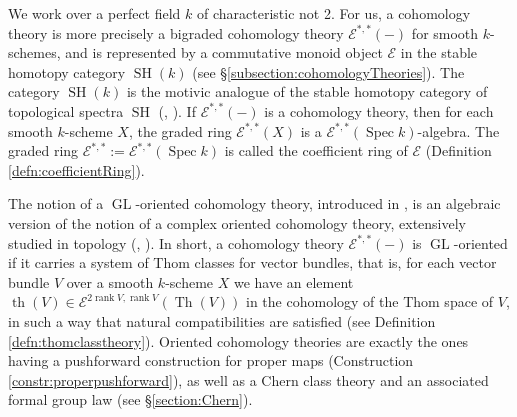 \documentclass[10pt]{amsart}
\theoremstyle{definition}
\theoremstyle{plain}
\numberwithin{equation}{section}
\newcommand{\0}{\emptyset}
\newcommand{\sE}{{\mathcal E}}
\newcommand{\GL}{{\operatorname{GL}}}
\newcommand{\Spec}{{\operatorname{Spec}}}
\newcommand{\SH}{{\operatorname{SH}}}
\newcommand{\Th}{{\operatorname{Th}}}
\renewcommand{\th}{{\operatorname{th}}}
\newcommand{\rnk}{{\operatorname{rank}}}
\begin{document}
We work over a perfect field $k$ of characteristic not 2. For us, a cohomology theory is more precisely a bigraded cohomology theory $\sE^{*,*}(-)$ for smooth $k$-schemes, and is represented by a commutative monoid object $\sE$ in the stable homotopy category $\SH(k)$ (see \S \ref{subsection:cohomologyTheories}). The category $\SH(k)$ \cite[Section 5]{voe:homotopy_theory} is the motivic analogue of the stable homotopy category of topological spectra $\SH$ (\cite{Boardman:Spectra}, \cite[Part III, Section 2]{Adams:homotopy}). If $\sE^{*,*}(-)$ is a cohomology theory, then for each smooth $k$-scheme $X$, the graded ring $\sE^{*,*}(X)$ is a $\sE^{*,*}(\Spec k)$-algebra. The graded ring $\sE^{*,*}:=\sE^{*,*}(\Spec k)$ is called the coefficient ring of $\sE$ (Definition \ref{defn:coefficientRing}).

The notion of a $\GL$-oriented cohomology theory, introduced in  \cite{Panin:pushforward}, is an algebraic version of the notion of a complex oriented cohomology theory, extensively studied in topology (\cite[Part II]{Adams:homotopy}, \cite[Chapter 1]{ravenel:cobordism}). In short, a cohomology theory $\sE^{*,*}(-)$ is $\GL$-oriented if it carries a system of Thom classes for vector bundles, that is, for each vector bundle $V$ over a smooth $k$-scheme $X$ we have an element $\th(V) \in \sE^{2\rnk V,\rnk V}(\Th(V))$ in the cohomology of the Thom space of $V$, in such a way that natural compatibilities are satisfied (see Definition \ref{defn:thomclasstheory}). Oriented cohomology theories are exactly the ones having a pushforward construction for proper maps (Construction \ref{constr:properpushforward}), as well as a Chern class theory and an associated formal group law (see \S \ref{section:Chern}). 
\end{document}
